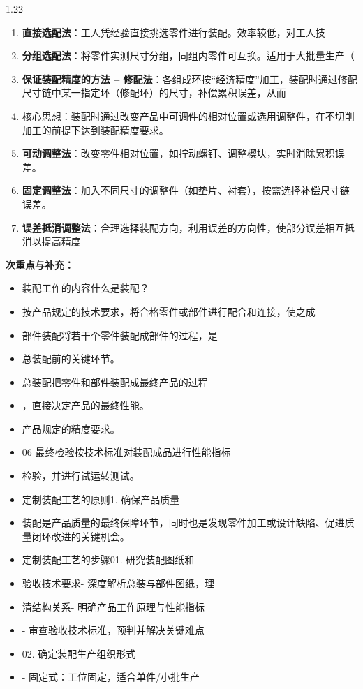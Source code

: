 \documentclass[12pt,a4paper]{article}
\begin{document}
\begin{spacing}{1.22}
\begin{tcolorbox}[colback=yellow!6,colframe=red!55!black,title=重点,left=1mm,right=1mm]
\begin{enumerate}[leftmargin=2.2em,label=\arabic*.]
  \item \textbf{直接选配法}：工人凭经验直接挑选零件进行装配。效率较低，对工人技
  \item \textbf{分组选配法}：将零件实测尺寸分组，同组内零件可互换。适用于大批量生产（
  \item \textbf{保证装配精度的方法 – 修配法}：各组成环按“经济精度”加工，装配时通过修配尺寸链中某一指定环（修配环）的尺寸，补偿累积误差，从而
  \item 核心思想：装配时通过改变产品中可调件的相对位置或选用调整件，在不切削加工的前提下达到装配精度要求。
  \item \textbf{可动调整法}：改变零件相对位置，如拧动螺钉、调整楔块，实时消除累积误差。
  \item \textbf{固定调整法}：加入不同尺寸的调整件（如垫片、衬套），按需选择补偿尺寸链误差。
  \item \textbf{误差抵消调整法}：合理选择装配方向，利用误差的方向性，使部分误差相互抵消以提高精度
\end{enumerate}
\end{tcolorbox}
\noindent\textbf{次重点与补充：}
\begin{itemize}[leftmargin=2.2em,label=--]
  \item 装配工作的内容什么是装配？
  \item 按产品规定的技术要求，将合格零件或部件进行配合和连接，使之成
  \item 部件装配将若干个零件装配成部件的过程，是
  \item 总装配前的关键环节。
  \item 总装配把零件和部件装配成最终产品的过程
  \item ，直接决定产品的最终性能。
  \item 产品规定的精度要求。
  \item 06 最终检验按技术标准对装配成品进行性能指标
  \item 检验，并进行试运转测试。
  \item 定制装配工艺的原则1. 确保产品质量
  \item 装配是产品质量的最终保障环节，同时也是发现零件加工或设计缺陷、促进质量闭环改进的关键机会。
  \item 定制装配工艺的步骤01. 研究装配图纸和
  \item 验收技术要求- 深度解析总装与部件图纸，理
  \item 清结构关系- 明确产品工作原理与性能指标
  \item - 审查验收技术标准，预判并解决关键难点
  \item 02. 确定装配生产组织形式
  \item - 固定式：工位固定，适合单件/小批生产

\end{itemize}
\end{spacing}
\end{document}
